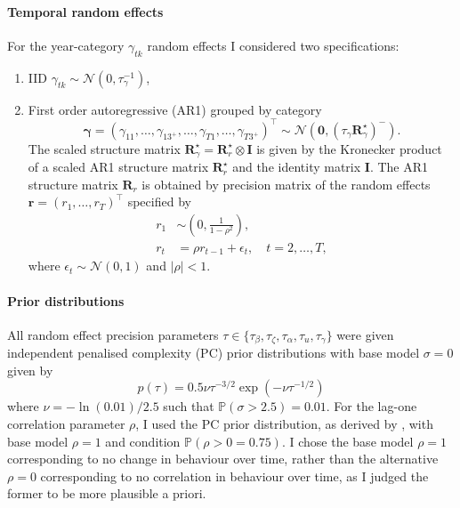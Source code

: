 \documentclass[a4paper, nobind]{templates/ociamthesis}
\providecommand{\tightlist}{%
  \setlength{\itemsep}{0pt}\setlength{\parskip}{0pt}}
\begin{document}
\hypertarget{temporal-random-effects}{%
\paragraph{Temporal random effects}\label{temporal-random-effects}}

For the year-category \(\gamma_{tk}\) random effects I considered two specifications:

\begin{enumerate}
\def\labelenumi{\arabic{enumi}.}
\tightlist
\item
  IID \(\gamma_{tk} \sim \mathcal{N}(0, \tau_\gamma^{-1})\),
\item
  First order autoregressive (AR1) grouped by category
  \[
  \boldsymbol{\mathbf{\gamma}} = (\gamma_{11}, \ldots, \gamma_{13^{+}}, \ldots, \gamma_{T1}, \ldots, \gamma_{T3^{+}})^\top \sim \mathcal{N}(\mathbf{0}, (\tau_\gamma \mathbf{R}^\star_\gamma)^{-}).
  \]
  The scaled structure matrix \(\mathbf{R}^\star_\gamma = \mathbf{R}^\star_r \otimes \mathbf{I}\) is given by the Kronecker product of a scaled AR1 structure matrix \(\mathbf{R}^\star_r\) and the identity matrix \(\mathbf{I}\).
  The AR1 structure matrix \(\mathbf{R}_r\) is obtained by precision matrix of the random effects \(\mathbf{r} = (r_1, \ldots, r_T)^\top\) specified by
  \begin{align}
  r_1 &\sim \left( 0, \frac{1}{1 - \rho^2} \right), \\
  r_t &= \rho r_{t - 1} + \epsilon_t, \quad t = 2, \ldots, T, 
  \end{align}
  where \(\epsilon_t \sim \mathcal{N}(0, 1)\) and \(|\rho| < 1\).
\end{enumerate}

\hypertarget{prior-distributions}{%
\paragraph{Prior distributions}\label{prior-distributions}}

All random effect precision parameters \(\tau \in \{\tau_\beta, \tau_\zeta, \tau_\alpha, \tau_u, \tau_\gamma\}\) were given independent penalised complexity (PC) prior distributions \autocite{simpson2017penalising} with base model \(\sigma = 0\) given by
\begin{equation}
p(\tau) = 0.5 \nu \tau^{-3/2} \exp \left( - \nu \tau^{-1/2} \right)
\end{equation}
where \(\nu = - \ln(0.01) / 2.5\) such that \(\mathbb{P}(\sigma > 2.5) = 0.01\).
For the lag-one correlation parameter \(\rho\), I used the PC prior distribution, as derived by \textcite{sorbye2017penalised}, with base model \(\rho = 1\) and condition \(\mathbb{P}(\rho > 0 = 0.75)\).
I chose the base model \(\rho = 1\) corresponding to no change in behaviour over time, rather than the alternative \(\rho = 0\) corresponding to no correlation in behaviour over time, as I judged the former to be more plausible a priori.
\end{document}
